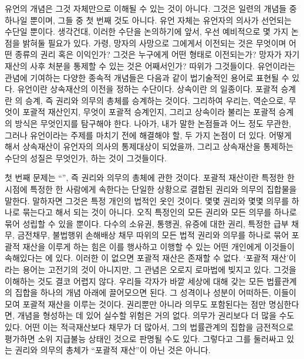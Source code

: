 유언의 개념은 그것 자체만으로 이해될 수 있는 것이 아니다.
그것은 일련의 개념들 중 하나일 뿐이며, 그들 중 첫 번째 것도 아니다.
유언 자체는 유언자의 의사가 선언되는 수단일 뿐이다.
생각건대,
이러한 수단을 논의하기에 앞서,
우선 예비적으로 몇 가지 논점을 밝혀둘 필요가 있다.
가령, 망자의 사망으로 그에게서 이전되는 것은 무엇이며 어떤 종류의
권리 혹은 이익인가? 그것은 누구에게 어떤 형태로 이전되는가?
망자가 자기 재산의 사후 처분을 통제할 수 있는 것은 어째서인가?
따위가 그것들이다.
유언이라는 관념에 기여하는 다양한 종속적 개념들은 다음과 같이 법기술적인
용어로 표현될 수 있다.
유언이란 상속재산의 이전을 정하는 수단이다.
상속이란 의 일종이다.
포괄적 승계란 의 승계, 즉
권리와 의무의 총체를 승계하는 것이다.
그리하여 우리는, 역순으로,
무엇이 포괄적 재산인지, 무엇이 포괄적 승계인지,
그리고 상속이라 불리는 포괄적 승계의 방식은 무엇인지를 탐구해야 한다.
나아가, 내가 말한 논점들과 어느 정도 무관한, 그러나
유언이라는 주제를 마치기 전에 해결해야 할, 두 가지 논점이 더 있다.
어떻게 해서 상속재산이 유언자의 의사의 통제대상이 되었을까,
그리고 상속재산을 통제하는 수단의 성질은 무엇인가, 하는 것이 그것들이다.

첫 번째 문제는 ``'',
즉 권리와 의무의 총체에 관한 것이다.
포괄적 재산이란
특정한 한 시점에 특정한 한 사람에게 속한다는 단일한 상황으로 결합된
권리와 의무의 집합물을 말한다.
말하자면 그것은 특정 개인의 법적인 옷\hanja{[衣服]}인 것이다.
몇몇 권리와 몇몇 의무를 하나로 묶는다고 해서 되는 것이 아니다.
오직 특정인의 모든 권리와 모든 의무를 하나로 묶어 성립할 수 있을 뿐이다.
다수의 소유권, 통행권, 유증에 대한 권리, 특정한 급부 채무, 금전채무,
불법행위 손해배상 채무 따위의 모든 법적 권리와 의무를 하나로 묶어
포괄적 재산을 이루게 하는 힘은
이를 행사하고 이행할 수 있는 어떤 개인에게
이것들이
속해있다는
에 있다.
이러한 이 없으면 포괄적 재산은 존재할 수 없다.
`포괄적 재산'이라는 용어는 고전기의 것이 아니지만,
그 관념은 오로지 로마법에 빚지고 있다.
그것을 이해하는 것도 결코 어렵지 않다.
우리들 각자가 바깥 세상에 대해 갖는 모든 법률관계의 집합을
하나의 개념 아래에 끌어모으면 된다.
그 성격이나 성분이 어떠하든, 이들이 모여 포괄적 재산을 이루는 것이다.
권리뿐만 아니라 의무도 포함된다는 점만 명심한다면,
개념을 형성하는 데 있어 실수할 위험은 거의 없다.
의무가 권리보다 더 많을 수도 있다.
어떤 이는 적극재산보다 채무가 더 많아서,
그의 법률관계의 집합을 금전적으로 평가하면 소위 지급불능 상태인 것으로
판명될 수도 있다.
그렇다고 그를 둘러싸고 있는 권리와 의무의 총체가
``포괄적 재산''이 아닌 것은 아니다.

